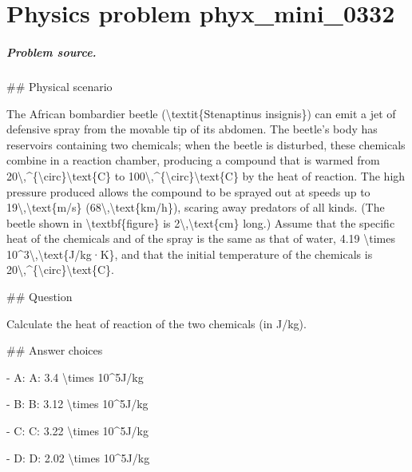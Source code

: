 
\chapter{Physics problem phyx\_mini\_0332}
\label{ch:PhyXMiniProblems_problem_phyx_mini_0332}

\paragraph{Problem source.}
\#\# Physical scenario

The African bombardier beetle (\textbackslash{}textit\{Stenaptinus insignis\}) can emit a jet of defensive spray from the movable tip of its abdomen. The beetle’s body has reservoirs containing two chemicals; when the beetle is disturbed, these chemicals combine in a reaction chamber, producing a compound that is warmed from 20\textbackslash{},\textasciicircum{}\{\textbackslash{}circ\}\textbackslash{}text\{C\} to 100\textbackslash{},\textasciicircum{}\{\textbackslash{}circ\}\textbackslash{}text\{C\} by the heat of reaction. The high pressure produced allows the compound to be sprayed out at speeds up to 19\textbackslash{},\textbackslash{}text\{m/s\} (68\textbackslash{},\textbackslash{}text\{km/h\}), scaring away predators of all kinds. (The beetle shown in \textbackslash{}textbf\{figure\} is 2\textbackslash{},\textbackslash{}text\{cm\} long.) Assume that the specific heat of the chemicals and of the spray is the same as that of water, 4.19 \textbackslash{}times 10\textasciicircum{}3\textbackslash{},\textbackslash{}text\{J/kg·K\}, and that the initial temperature of the chemicals is 20\textbackslash{},\textasciicircum{}\{\textbackslash{}circ\}\textbackslash{}text\{C\}.

\#\# Question

Calculate the heat of reaction of the two chemicals (in J/kg).

\#\# Answer choices

- A: A: 3.4 \textbackslash{}times 10\textasciicircum{}5J/kg

- B: B: 3.12 \textbackslash{}times 10\textasciicircum{}5J/kg

- C: C: 3.22 \textbackslash{}times 10\textasciicircum{}5J/kg

- D: D: 2.02 \textbackslash{}times 10\textasciicircum{}5J/kg


